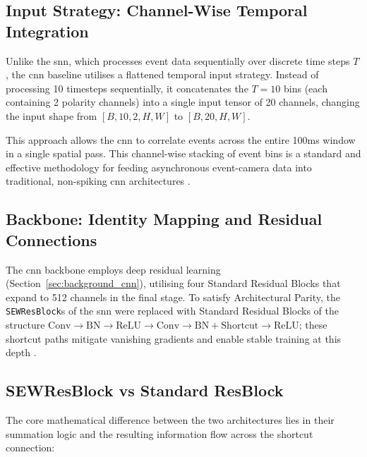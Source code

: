 \subsection{Input Strategy: Channel-Wise Temporal Integration}
Unlike the \gls{snn}, which processes event data sequentially over discrete time steps $T$, the \gls{cnn} baseline utilises a flattened temporal input strategy. 
Instead of processing 10 timesteps sequentially, it concatenates the $T=10$ bins (each containing 2 polarity channels) into a single input tensor of 20 channels, changing the input shape from $[B, 10, 2, H, W]$ to $[B, 20, H, W]$. 

This approach allows the \gls{cnn} to correlate events across the entire 100ms window in a single spatial pass. This channel-wise stacking of event bins is a standard and effective methodology for feeding asynchronous event-camera data into traditional, non-spiking \gls{cnn} architectures \cite{gehrig2019}.

\subsection{Backbone: Identity Mapping and Residual Connections}
\label{subsec:cnn_backbone}

The \gls{cnn} backbone employs deep residual learning (Section~\ref{sec:background_cnn}), utilising four Standard Residual Blocks that expand to 512 channels in the final stage. To satisfy Architectural Parity, the \texttt{SEWResBlock}s of the \gls{snn} were replaced with Standard Residual Blocks of the structure $\text{Conv} \rightarrow \text{BN} \rightarrow \text{ReLU} \rightarrow \text{Conv} \rightarrow \text{BN} + \text{Shortcut} \rightarrow \text{ReLU}$; these shortcut paths mitigate vanishing gradients and enable stable training at this depth \cite{he2015deep}.

\subsection{SEWResBlock vs Standard ResBlock}
The core mathematical difference between the two architectures lies in their summation logic and the resulting information flow across the shortcut connection:

